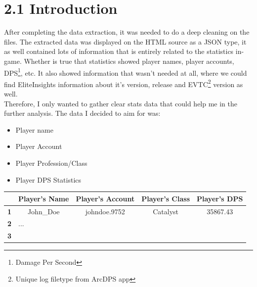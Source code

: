 \documentclass[12pt,a4paper]{article}
\begin{document}
    \section*{\large 2.1 Introduction}
    After completing the data extraction, it was needed to do a deep cleaning on the files.
    The extracted data was displayed on the HTML source as a JSON type, it as well contained
    lots of information that is entirely related to the statistics in-game. Whether is true that
    statistics showed player names, player accounts, DPS\footnote{Damage Per Second}, etc. It
    also showed information that wasn't needed at all, where we could find EliteInsights information
    about it's version, release and EVTC\footnote{Unique log filetype from ArcDPS app} version as well.\\

    Therefore, I only wanted to gather clear stats data that could help me in the further
    analysis. The data I decided to aim for was:
    \begin{itemize}
        \item Player name
        \item Player Account
        \item Player Profession/Class
        \item Player DPS Statistics
    \end{itemize}

    \begin{table}[!h]
        \begin{tabular}{|c|llll}
        \hline
                                           & \multicolumn{1}{c|}{\cellcolor[HTML]{CBCEFB}Player's Name} & \multicolumn{1}{c|}{\cellcolor[HTML]{CBCEFB}Player's Account} & \multicolumn{1}{c|}{\cellcolor[HTML]{CBCEFB}Player's Class} & \multicolumn{1}{c|}{\cellcolor[HTML]{CBCEFB}Player's DPS} \\ \hline
        \cellcolor[HTML]{FFCCC9}\textbf{1} & \multicolumn{1}{c}{John\_Doe}                              & \multicolumn{1}{c}{johndoe.9752}                              & \multicolumn{1}{c}{Catalyst}                                & \multicolumn{1}{c}{35867.43}                              \\ \cline{1-1}
        \cellcolor[HTML]{FFCCC9}\textbf{2} & ...                                                        &                                                               &                                                             &                                                           \\ \cline{1-1}
        \cellcolor[HTML]{FFCCC9}\textbf{3} &                                                            &                                                               &                                                             &                                                           \\ \cline{1-1}
        \end{tabular}
    \end{table}
\end{document}
